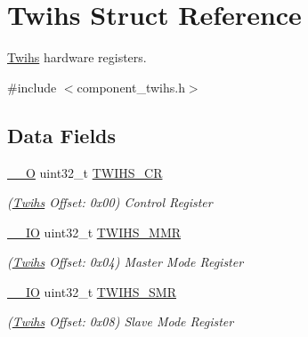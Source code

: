 \hypertarget{structTwihs}{}\section{Twihs Struct Reference}
\label{structTwihs}


\mbox{\hyperlink{structTwihs}{Twihs}} hardware registers.  




{\ttfamily \#include $<$component\+\_\+twihs.\+h$>$}

\subsection*{Data Fields}
\begin{DoxyCompactItemize}
\item 
\mbox{\label{structTwihs_a6de7e3c2a08386696770e57b60ca03dd}} 
\mbox{\hyperlink{core__cm7_8h_a7e25d9380f9ef903923964322e71f2f6}{\+\_\+\+\_\+O}} uint32\+\_\+t \mbox{\hyperlink{structTwihs_a6de7e3c2a08386696770e57b60ca03dd}{T\+W\+I\+H\+S\+\_\+\+CR}}
\begin{DoxyCompactList}\small\item\em (\mbox{\hyperlink{structTwihs}{Twihs}} Offset\+: 0x00) Control Register \end{DoxyCompactList}\item 
\mbox{\label{structTwihs_a285481ca7a364f1a9d0238c0dcc5e974}} 
\mbox{\hyperlink{core__cm7_8h_aec43007d9998a0a0e01faede4133d6be}{\+\_\+\+\_\+\+IO}} uint32\+\_\+t \mbox{\hyperlink{structTwihs_a285481ca7a364f1a9d0238c0dcc5e974}{T\+W\+I\+H\+S\+\_\+\+M\+MR}}
\begin{DoxyCompactList}\small\item\em (\mbox{\hyperlink{structTwihs}{Twihs}} Offset\+: 0x04) Master Mode Register \end{DoxyCompactList}\item 
\mbox{\label{structTwihs_a438a8b79eae150ff7a791e693ee6e808}} 
\mbox{\hyperlink{core__cm7_8h_aec43007d9998a0a0e01faede4133d6be}{\+\_\+\+\_\+\+IO}} uint32\+\_\+t \mbox{\hyperlink{structTwihs_a438a8b79eae150ff7a791e693ee6e808}{T\+W\+I\+H\+S\+\_\+\+S\+MR}}
\begin{DoxyCompactList}\small\item\em (\mbox{\hyperlink{structTwihs}{Twihs}} Offset\+: 0x08) Slave Mode Register \end{DoxyCompactList}\item 

\end{DoxyCompactItemize}
